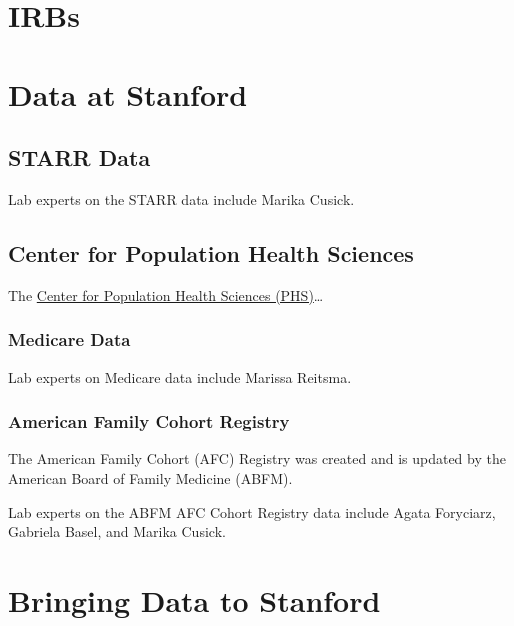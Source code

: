 \documentclass[
]{book}
\begin{document}
\hypertarget{irbs}{%
\section{IRBs}\label{irbs}}

\hypertarget{data-at-stanford}{%
\section{Data at Stanford}\label{data-at-stanford}}

\hypertarget{starr-data}{%
\subsection{STARR Data}\label{starr-data}}

Lab experts on the STARR data include Marika Cusick.

\hypertarget{center-for-population-health-sciences}{%
\subsection{Center for Population Health Sciences}\label{center-for-population-health-sciences}}

The \href{https://med.stanford.edu/phs.html}{Center for Population Health Sciences (PHS)}\ldots{}

\hypertarget{medicare-data}{%
\subsubsection*{Medicare Data}\label{medicare-data}}

Lab experts on Medicare data include Marissa Reitsma.

\hypertarget{american-family-cohort-registry}{%
\subsubsection*{American Family Cohort Registry}\label{american-family-cohort-registry}}

The American Family Cohort (AFC) Registry was created and is updated by the American Board of Family Medicine (ABFM).

Lab experts on the ABFM AFC Cohort Registry data include Agata Foryciarz, Gabriela Basel, and Marika Cusick.

\hypertarget{bringing-data-to-stanford}{%
\section{Bringing Data to Stanford}\label{bringing-data-to-stanford}}
\end{document}

